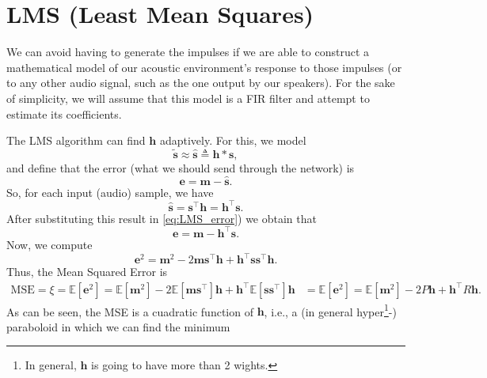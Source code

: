 \section{LMS (Least Mean Squares)}

We can avoid having to generate the impulses if we are able to
construct a mathematical model of our acoustic environment's response
to those impulses (or to any other audio signal, such as the one output
by our speakers). For the sake of simplicity, we will assume that this
model is a FIR filter and attempt to estimate its coefficients.

The LMS algorithm can find $\mathbf{h}$ adaptively. For this, we model
\begin{equation}
  \tilde{\mathbf{s}} \approx \hat{\mathbf{s}} \triangleq \mathbf{h} * \mathbf{s},
\end{equation}and define that the error (what we should send through the network) is
\begin{equation}
  \mathbf{e}=\mathbf{m}-\hat{\mathbf{s}}.
  \label{eq:LMS_error}
\end{equation}
So, for each input (audio) sample, we have
\begin{equation}
  \hat{\mathbf{s}} = \mathbf{s}^\top\mathbf{h} = \mathbf{h}^\top\mathbf{s}.
\end{equation}
After substituting this result in \eqref{eq:LMS_error}) we obtain that
\begin{equation}
  \mathbf{e}=\mathbf{m} - \mathbf{h}^\top\mathbf{s}.
\end{equation}
Now, we compute
\begin{equation}
  \mathbf{e}^2 = \mathbf{m}^2 - 2\mathbf{m}\mathbf{s}^\top\mathbf{h} + \mathbf{h}^\top\mathbf{s}\mathbf{s}^\top\mathbf{h}.
  \label{eq:e_squared}
\end{equation}
Thus, the Mean Squared Error is
\begin{equation}
  \begin{split}
  \text{MSE} = \xi = \mathbb{E}[\mathbf{e}^2] = \mathbb{E}[\mathbf{m}^2] - 2\mathbb{E}[\mathbf{m}\mathbf{s}^\top]\mathbf{h} + \mathbf{h}^\top\mathbb{E}[\mathbf{s}\mathbf{s}^\top]\mathbf{h} & = \mathbb{E}[\mathbf{e}^2] = \mathbb{E}[\mathbf{m}^2] - 2P\mathbf{h} + \mathbf{h}^\top R\mathbf{h}.
    \end{split}
\end{equation}
As can be seen, the MSE is a cuadratic function of $\mathbf{h}$, i.e.,
a (in general hyper\footnote{In general, $\mathbf{h}$ is going to have
more than 2 wights.}-) paraboloid in which we can find the minimum

